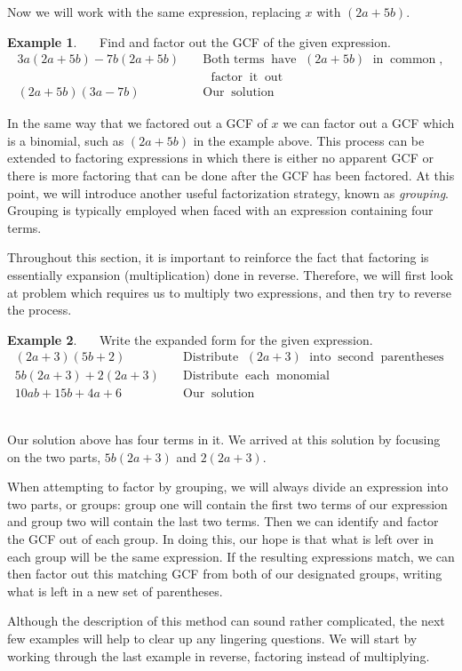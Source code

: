 \documentclass[12pt]{book}
\theoremstyle{definition}
\newtheorem{example}{Example}
\newcommand{\tmop}[1]{\ensuremath{\operatorname{#1}}}
\begin{document}
Now we will work with the same expression, replacing $x$ with $(2 a + 5 b)$.

\begin{example}~~~Find and factor out the GCF of the given expression.
  \begin{eqnarray*}
    3 a (2 a + 5 b) - 7 b (2 a + 5 b) &  & \tmop{Both~terms} \tmop{have~} (2 a + 5 b)
    \tmop{~in} \tmop{common},\\
		&& ~~~\tmop{factor} \tmop{it} \tmop{out}\\
    (2 a + 5 b) (3 a - 7 b) &  & \tmop{Our} \tmop{solution}
  \end{eqnarray*}
\end{example}

In the same way that we factored out a GCF of $x$ we can factor out a GCF which is a binomial, such as $(2 a + 5 b)$ in the example above. This process can be extended to factoring expressions in which there is either no apparent GCF or there is more factoring that can be done after the GCF has been factored.  At this point, we will introduce another useful factorization strategy, known as {\it grouping}.  Grouping is typically employed when faced with an expression containing four terms.\par
Throughout this section, it is important to reinforce the fact that factoring is essentially expansion (multiplication) done in reverse.  Therefore, we will first look at problem which requires us to multiply two expressions, and then try to reverse the process.

\begin{example}~~~Write the expanded form for the given expression.
  \begin{eqnarray*}
    (2 a + 3) (5 b + 2) &  & \tmop{Distribute~} (2 a + 3) \tmop{~into}
    \tmop{second} \tmop{parentheses}\\
    5 b (2 a + 3) + 2 (2 a + 3) &  & \tmop{Distribute} \tmop{each}
    \tmop{monomial}\\
    10ab + 15 b + 4 a + 6 &  & \tmop{Our} \tmop{solution}
  \end{eqnarray*}
\end{example}
~\\
Our solution above has four terms in it.  We arrived at this solution by focusing on the two parts, $5 b (2 a + 3)$ and $2 (2 a + 3)$.\par
When attempting to factor by grouping, we will always divide an expression into two parts, or groups: group one will contain the first two terms of our expression and group two will contain the last two terms. Then we can identify and factor the GCF out of each group.  In doing this, our hope is that what is left over in each group will be the same expression. If the resulting expressions match, we can then factor out this matching GCF from both of our designated groups, writing what is left in a new set of parentheses.\par
Although the description of this method can sound rather complicated, the next few examples will help to clear up any lingering questions.  We will start by working through the last example in reverse, factoring instead of multiplying.
\end{document}
